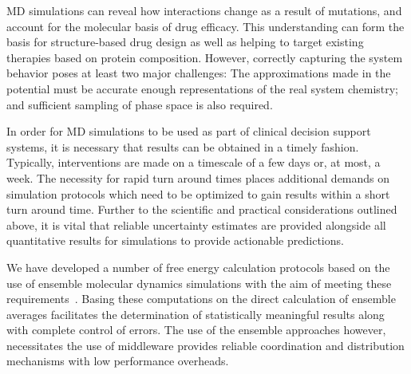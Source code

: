 MD simulations can reveal how interactions change as a result of mutations,
and account for the molecular basis of drug efficacy. This understanding can
form the basis for structure-based drug design as well as helping to target
existing therapies based on protein composition. However, correctly capturing
the system behavior poses at least two major challenges: The approximations
made in the potential must be accurate enough representations of the real
system chemistry; and sufficient sampling of phase space is also required.

In order for MD simulations to be used as part of clinical decision support
systems, it is necessary that results can be obtained in a timely fashion.
Typically, interventions are made on a timescale of a few days or, at most, a
week. The necessity for rapid turn around times places additional demands on
simulation protocols which need to be optimized to gain results within a short
turn around time. Further to the scientific and practical considerations
outlined above, it is vital that reliable uncertainty estimates are
provided alongside all quantitative results for simulations to provide
actionable predictions.

We have developed a number of free energy calculation protocols based on the
use of ensemble molecular dynamics simulations with the aim of meeting these
requirements~\cite{Sadiq2008, Sadiq2010, Wan2017brd4, Wan2017trk}. Basing
these computations on the direct calculation of ensemble averages facilitates
the determination of statistically meaningful results along with complete
control of errors. The use of the ensemble approaches however, necessitates
the use of middleware provides reliable coordination and distribution
mechanisms with low performance overheads.

